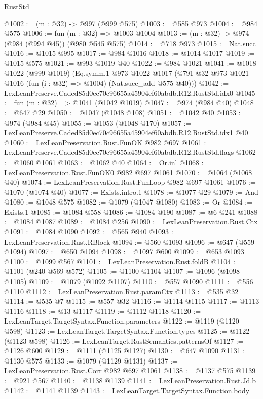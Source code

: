 \begin{lexlean}{RustStd}
\begin{coremodule}
@1002 := (m : @32) -> @997 (@999 @575)
@1003 := @585 @973
@1004 := @984 @575
@1006 := fun (m : @32) => @1003 @1004
@1013 := (m : @32) -> @974 (@984 (@994 @45)) (@980 @545 @575)
@1014 := @718 @973
@1015 := Nat.succ
@1016 := @1015 @995
@1017 := @984 @1016
@1018 := @1014 @1017
@1019 := @1015 @575
@1021 := @993 @1019 @40
@1022 := @984 @1021
@1041 := @1018
    @1022
    (@999 @1019)
    (Eq.symm.{1}
      @973
      @1022
      @1017
      (@791 @32 @973 @1021 @1016 (fun (i : @32) => @1004) (Nat.succ_add @575 @40)))
@1042 := LexLeanPreserve.Caded85d0ec70c96655a45904ef60abdb.R12.RustStd.idx0
@1045 := fun (m : @32) => @1041 (@1042 @1019)
@1047 := @974 (@984 @40)
@1048 := @647 @29
@1050 := @1047 (@1048 @108)
@1051 := @1042 @40
@1053 := @974 (@984 @45)
@1055 := @1053 (@1048 @170)
@1057 := LexLeanPreserve.Caded85d0ec70c96655a45904ef60abdb.R12.RustStd.idx1 @40
@1060 := LexLeanPreservation.Rust.FunOK @982 @697
@1061 := LexLeanPreserve.Caded85d0ec70c96655a45904ef60abdb.R12.RustStd.flags
@1062 := @1060 @1061
@1063 := @1062 @40
@1064 := Or.inl
@1068 := LexLeanPreservation.Rust.FunOK0 @982 @697 @1061
@1070 := @1064 (@1068 @40)
@1074 := LexLeanPreservation.Rust.FunLoop @982 @697 @1061
@1076 := @1070 (@1074 @40)
@1077 := Exists.intro.{1}
@1078 := @1077 @29
@1079 := And
@1080 := @1048 @575
@1082 := @1079 (@1047 @1080)
@1083 := Or
@1084 := Exists.{1}
@1085 := @1084 @558
@1086 := @1084 @190
@1087 := @6 @241
@1088 := @1084 @1087
@1089 := @1084 @256
@1090 := LexLeanPreservation.Rust.Ctx
@1091 := @1084 @1090
@1092 := @565 @940
@1093 := LexLeanPreservation.Rust.RBlock
@1094 := @560 @1093
@1096 := @647 (@559 @1094)
@1097 := @650 @1094
@1098 := @1097 @600
@1099 := @653 @1093
@1100 := @1099 @567
@1101 := LexLeanPreservation.Rust.foldB
@1104 := @1101 (@240 @569 @572)
@1105 := @1100 @1104
@1107 := @1096 (@1098 @1105)
@1109 := @1079 (@1092 @1107)
@1110 := @557 @1090
@1111 := @556 @1110
@1112 := LexLeanPreservation.Rust.paramCtx
@1113 := @535 @32
@1114 := @535 @7
@1115 := @557 @32
@1116 := @1114 @1115
@1117 := @1113 @1116
@1118 := @13 @1117
@1119 := @1112 @1118
@1120 := LexLeanTarget.TargetSyntax.Function.parameters
@1122 := @1119 (@1120 @598)
@1123 := LexLeanTarget.TargetSyntax.Function.types
@1125 := @1122 (@1123 @598)
@1126 := LexLeanTarget.RustSemantics.patternsOf
@1127 := @1126 @600
@1129 := @1111 (@1125 @1127)
@1130 := @647 @1090
@1131 := @1130 @575
@1133 := @1079 (@1129 @1131)
@1137 := LexLeanPreservation.Rust.Corr @982 @697 @1061
@1138 := @1137 @575
@1139 := @921 @567
@1140 := @1138 @1139
@1141 := LexLeanPreservation.Rust.Jd.b
@1142 := @1141 @1139
@1143 := LexLeanTarget.TargetSyntax.Function.body

\end{coremodule}
\end{lexlean}
